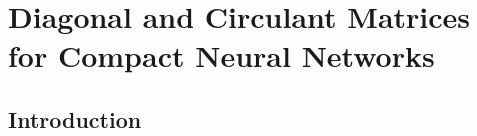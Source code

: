 \chapter{Diagonal and Circulant Matrices for Compact Neural Networks}
\label{chapter:ch4-diagonal_circulant_neural_network}
\localtoc


\section{Introduction}
\label{chapter:ch4-introduction}



